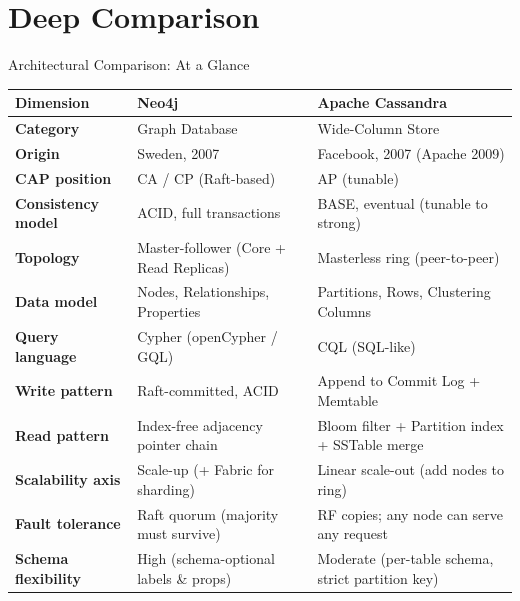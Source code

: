 \documentclass[aspectratio=169]{beamer}
\begin{document}
\section{Deep Comparison}

\begin{frame}{Architectural Comparison: At a Glance}
  \scriptsize
  \renewcommand{\arraystretch}{1.5}
  \begin{tabular}{>{\bfseries}p{2.5cm} p{5.0cm} p{5.0cm}}
    \toprule
    \textbf{Dimension} & \textbf{\textcolor{neo4jGreen}{Neo4j}} & \textbf{\textcolor{cassBlue}{Apache Cassandra}} \\
    \midrule
    Category & Graph Database & Wide-Column Store \\
    Origin & Sweden, 2007 & Facebook, 2007 (Apache 2009) \\
    CAP position & CA / CP (Raft-based) & AP (tunable) \\
    Consistency model & ACID, full transactions & BASE, eventual (tunable to strong) \\
    Topology & Master-follower (Core + Read Replicas) & Masterless ring (peer-to-peer) \\
    Data model & Nodes, Relationships, Properties & Partitions, Rows, Clustering Columns \\
    Query language & Cypher (openCypher / GQL) & CQL (SQL-like) \\
    Write pattern & Raft-committed, ACID & Append to Commit Log + Memtable \\
    Read pattern & Index-free adjacency pointer chain & Bloom filter + Partition index + SSTable merge \\
    Scalability axis & Scale-up (+ Fabric for sharding) & Linear scale-out (add nodes to ring) \\
    Fault tolerance & Raft quorum (majority must survive) & RF copies; any node can serve any request \\
    Schema flexibility & High (schema-optional labels \& props) & Moderate (per-table schema, strict partition key) \\
    \bottomrule
  \end{tabular}
\end{frame}
\end{document}
